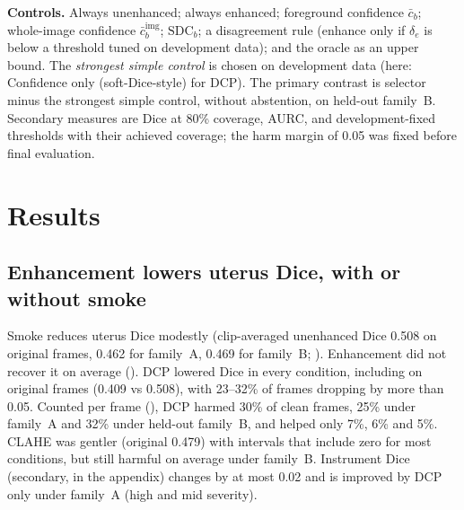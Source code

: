 \documentclass{midl}
\begin{document}
\textbf{Controls.} Always unenhanced; always enhanced; foreground confidence $\bar c_b$; whole-image confidence $\bar c^{\mathrm{img}}_b$; $\mathrm{SDC}_b$; a disagreement rule (enhance only if $\delta_e$ is below a threshold tuned on development data); and the oracle as an upper bound. The \emph{strongest simple control} is chosen on development data (here: Confidence only (soft-Dice-style) for DCP). The primary contrast is selector minus the strongest simple control, without abstention, on held-out family~B. Secondary measures are Dice at 80\% coverage, AURC, and development-fixed thresholds with their achieved coverage; the harm margin of 0.05 was fixed before final evaluation.

\section{Results}
\label{sec:res}
\subsection{Enhancement lowers uterus Dice, with or without smoke}
Smoke reduces uterus Dice modestly (clip-averaged unenhanced Dice 0.508 on original frames, 0.462 for family~A, 0.469 for family~B; ). Enhancement did not recover it on average (). DCP lowered Dice in every condition, including on original frames (0.409 vs 0.508), with 23--32\% of frames dropping by more than 0.05. Counted per frame (), DCP harmed 30\% of clean frames, 25\% under family~A and 32\% under held-out family~B, and helped only 7\%, 6\% and 5\%. CLAHE was gentler (original 0.479) with intervals that include zero for most conditions, but still harmful on average under family~B. Instrument Dice (secondary,  in the appendix) changes by at most 0.02 and is improved by DCP only under family~A (high and mid severity).
\end{document}
